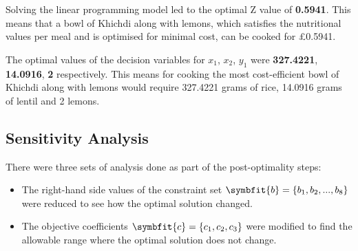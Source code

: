 \documentclass[
]{article}
\begin{document}
Solving the linear programming model led to the optimal Z value of \textbf{0.5941}.
This means that a bowl of Khichdi along with lemons, which satisfies the nutritional values per meal and is optimised for minimal cost, can be cooked for \pounds 0.5941.

The optimal values of the decision variables for \(x_1\), \(x_2\), \(y_1\) were \textbf{327.4221}, \textbf{14.0916}, \textbf{2} respectively. 
This means for cooking the most cost-efficient bowl of Khichdi along with lemons would require 327.4221 grams of rice, 14.0916 grams of lentil and 2 lemons.

\hypertarget{sensitivity-analysis-2}{%
	\subsection{Sensitivity Analysis}\label{sensitivity-analysis-2}}

There were three sets of analysis done as part of the post-optimality steps:
\begin{itemize}
	\item The right-hand side values of the constraint set $\symbfit{b} = \{b_1, b_2, ..., b_8\}$ were reduced to see how the optimal solution changed.
	\item The objective coefficients $\symbfit{c} = \{c_1, c_2, c_3 \}$ were modified to find the allowable range where the optimal solution does not change.
\end{itemize}

\vspace{4em}
\end{document}
